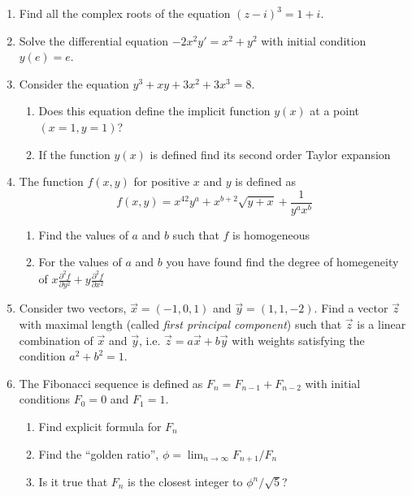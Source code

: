 \documentclass[12pt,a4paper]{article}
\begin{document}
\begin{enumerate}

\item Find all the complex roots of the equation $(z-i)^3=1+i$.

\item Solve the differential equation $-2x^2y'=x^2+y^2$ with initial condition $y(e)=e$.

\item Consider the equation $y^3+xy+3x^2+3x^3=8$. 
\begin{enumerate}
\item Does this equation define the implicit function $y(x)$ at a point $(x=1,y=1)$?
\item If the function $y(x)$ is defined find its second order Taylor expansion
\end{enumerate}

\item The function $f(x,y)$ for positive $x$ and $y$ is defined as
\[
f(x,y)=x^{42}y^a + x^{b+2}\sqrt{y+x}+\frac{1}{y^a x^b}
\]

\begin{enumerate}
\item Find the values of $a$ and $b$ such that $f$ is homogeneous
\item For the values of  $a$ and $b$ you have found find the degree of homegeneity of $x\frac{\partial^2 f}{\partial y^2} +y\frac{\partial^2 f}{\partial x^2}$
\end{enumerate}

\item Consider two vectors, $\vec{x}=(-1,0,1)$ and $\vec{y}=(1,1,-2)$. Find a vector $\vec{z}$ with maximal length (called \textit{first principal component}) such that $\vec{z}$ is a linear combination of $\vec{x}$ and $\vec{y}$, i.e. $\vec{z}=a \vec{x} + b \vec{y}$ with weights satisfying the condition $a^2+b^2=1$.

\item The Fibonacci sequence is defined as $F_n=F_{n-1}+F_{n-2}$ with initial conditions $F_0=0$ and $F_1=1$. 
\begin{enumerate}
\item Find explicit formula for $F_n$
\item Find the ``golden ratio'', $\phi=\lim_{n\to\infty} F_{n+1}/F_n$
\item Is it true that $F_n$ is the closest integer to $\phi^n/\sqrt{5}$?
\end{enumerate}



\end{enumerate}
\end{document}
